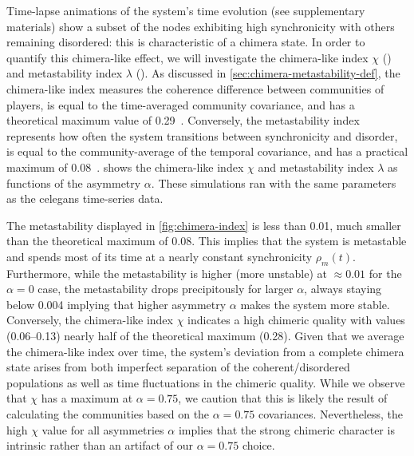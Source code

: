 \documentclass[pdflatex,lineno,referee,sn-nature]{sn-jnl}
\begin{document}
Time-lapse animations of the system's time evolution
(see supplementary materials)
show a subset of the nodes exhibiting high synchronicity
with others remaining disordered: this is characteristic of a chimera state.
In order to quantify this chimera-like effect, we will investigate
the chimera-like index $\chi$ ()
and metastability index $\lambda$ ().
As discussed in \cref{sec:chimera-metastability-def},
the chimera-like index
measures the coherence difference between communities of players,
is equal to the time-averaged community covariance,
and has a theoretical maximum value
of \num{0.29}~\citep{shanahan2010metastable}.
Conversely, the metastability index
represents how often the system transitions
between synchronicity and disorder,
is equal to the community-average of the temporal covariance,
and has a practical maximum of \num{0.08}~\citep{shanahan2010metastable}.
 shows the
 chimera-like index $\chi$
and
 metastability index $\lambda$
as functions of the asymmetry $\alpha$.
These simulations ran with the same parameters as the
\gls{celegans} time-series data.

The metastability displayed in \cref{fig:chimera-index}
is less than \num{0.01}, much smaller
than the theoretical maximum of \num{0.08}.
This implies that the system is metastable
and spends most of its time at a nearly constant
synchronicity $\rho_m(t)$.
Furthermore, while the metastability is higher (more unstable)
at $\approx \num{0.01}$ for the $\alpha = 0$ case,
the metastability drops precipitously for larger $\alpha$,
always staying below \num{0.004} implying that
higher asymmetry $\alpha$ makes the system more stable.
Conversely, the chimera-like index $\chi$
indicates a high chimeric quality
with values (\numrange{0.06}{0.13})
nearly half of the theoretical maximum (\num{0.28}).
Given that we average the chimera-like index over time,
the system's deviation from a complete chimera state
arises from both imperfect separation of the coherent/disordered populations
as well as time fluctuations in the chimeric quality.
While we observe that $\chi$ has a maximum at $\alpha = \num{0.75}$,
we caution that this is likely the result of calculating the communities
based on the $\alpha = \num{0.75}$ covariances.
Nevertheless, the high $\chi$ value for all asymmetries $\alpha$
implies that the strong chimeric character is intrinsic
rather than an artifact of our $\alpha = \num{0.75}$ choice.
\end{document}
